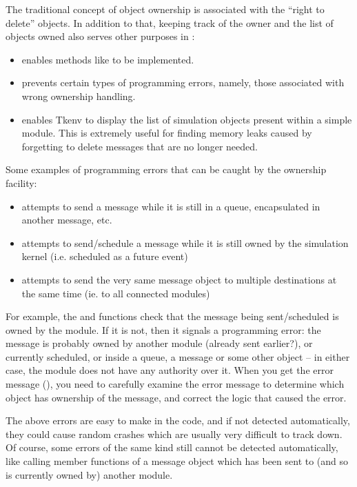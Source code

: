 The traditional concept of object ownership is associated with
the ``right to delete'' objects. In addition to that,
keeping track of the owner and the list of objects owned also
serves other purposes in {\opp}:

\begin{itemize}
    \item{enables methods like  to be implemented.}

    \item{prevents certain types of programming errors, namely,
    those associated with wrong ownership handling.}

    \item{enables Tkenv to display the list of simulation objects
    present within a simple module. This is extremely useful for finding
    memory leaks caused by forgetting to delete messages that are
    no longer needed.}
\end{itemize}

Some examples of programming errors that can be caught
by the ownership facility:

\begin{itemize}
    \item{attempts to send a message while it is still in a queue,
    encapsulated in another message, etc.}

    \item{attempts to send/schedule a message while it is still owned
    by the simulation kernel (i.e. scheduled as a future event)}

    \item{attempts to send the very same message object to multiple
    destinations at the same time (ie. to all connected modules)}
\end{itemize}

For example, the  and  functions check
that the message being sent/scheduled is owned by the module.
If it is not, then it signals a programming error: the message is probably
owned by another module (already sent earlier?), or currently scheduled, or
inside a queue, a message or some other object -- in either case, the
module does not have any authority over it. When you get the error message
(), you need to carefully examine the error
message to determine which object has ownership of the message, and correct
the logic that caused the error.

The above errors are easy to make in the code, and if not detected
automatically, they could cause random crashes which are usually very
difficult to track down. Of course, some errors of the same kind still
cannot be detected automatically, like calling member functions of a
message object which has been sent to (and so is currently owned by) another
module.


